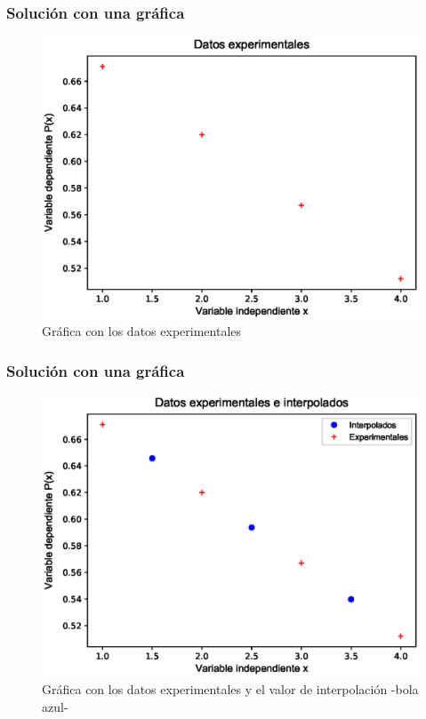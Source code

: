 \begin{frame}
\frametitle{Solución con una gráfica}
\begin{figure}
	\centering
	\includegraphics[scale=0.5]{Imagenes/InterpLagrangen3_01.eps}
	\caption{Gráfica con los datos experimentales}
\end{figure}
\end{frame}
\begin{frame}
\frametitle{Solución con una gráfica}
\begin{figure}
	\centering
	\includegraphics[scale=0.5]{Imagenes/InterpLagrangen3_02.eps}
	\caption{Gráfica con los datos experimentales y el valor de interpolación -bola azul-}
\end{figure}
\end{frame}
